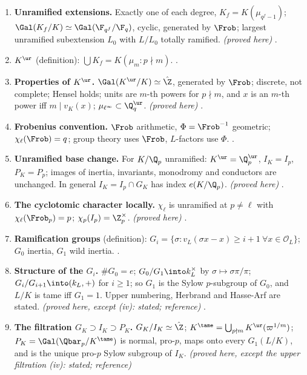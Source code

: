 \begin{enumerate}[label=\textbf{\thechapter.\arabic*}]
.
\item \textbf{Unramified extensions.} Exactly one of each degree, $K_f=K(\mu_{q^f-1})$; $\Gal(K_f/K)\simeq\Gal(\F_{q^f}/\F_q)$, cyclic, generated by $\Frob$; largest unramified
subextension $L_0$ with $L/L_0$ totally ramified. \emph{(proved here)} .
\item \textbf{$K^{\ur}$} (definition): $\bigcup K_f=K(\mu_m:p\nmid m)$. .
\item \textbf{Properties of $K^{\ur}$.} $\Gal(K^{\ur}/K)\simeq\hat\Z$, generated by $\Frob$; discrete, not complete; Hensel holds; units are $m$-th powers for $p\nmid m$, and
$x$ is an $m$-th power iff $m\mid v_K(x)$; $\mu_{\ell^\infty}\subset\Q_q^{\ur}$. \emph{(proved here)} .
\item \textbf{Frobenius convention.} $\Frob$ arithmetic, $\Phi=\Frob^{-1}$ geometric; $\chi_\ell(\Frob)=q$; group theory uses $\Frob$, $L$-factors use $\Phi$. .
\item \textbf{Unramified base change.} For $K/\Q_p$ unramified: $K^{\ur}=\Q_p^{\ur}$, $I_K=I_p$, $P_K=P_p$; images of inertia, invariants, monodromy and conductors are unchanged. In
general $I_K=I_p\cap G_K$ has index $e(K/\Q_p)$. \emph{(proved here)} .
\item \textbf{The cyclotomic character locally.} $\chi_\ell$ is unramified at $p\ne\ell$ with $\chi_\ell(\Frob_p)=p$; $\chi_p(I_p)=\Z_p^\times$. \emph{(proved here)}
.
\item \textbf{Ramification groups} (definition): $G_i=\{\sigma:v_L(\sigma x-x)\ge i+1\ \forall x\in\mathcal O_L\}$; $G_0$ inertia, $G_1$ wild inertia. .
\item \textbf{Structure of the $G_i$.} $\#G_0=e$; $G_0/G_1\into k_L^\times$ by $\sigma\mapsto\sigma\pi/\pi$; $G_i/G_{i+1}\into(k_L,+)$ for $i\ge1$; so $G_1$ is the Sylow $p$-subgroup of $G_0$,
and $L/K$ is tame iff $G_1=1$. Upper numbering, Herbrand and Hasse-Arf are stated. \emph{(proved here, except (iv): stated; reference)}
.
\item \textbf{The filtration $G_K\supset I_K\supset P_K$.} $G_K/I_K\simeq\hat\Z$; $K^{\tame}=\bigcup_{p\nmid m}K^{\ur}(\varpi^{1/m})$; $P_K=\Gal(\Qbar_p/K^{\tame})$ is normal, pro-$p$, maps onto every
$G_1(L/K)$, and is the unique pro-$p$ Sylow subgroup of $I_K$. \emph{(proved here, except the upper filtration (iv): stated; reference)}

\end{enumerate}

